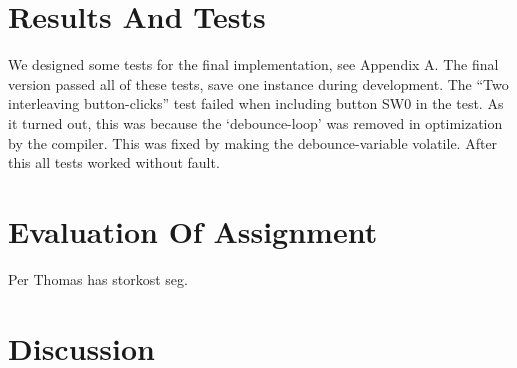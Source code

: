 \documentclass[a4paper,12pt]{article}
\begin{document}
\clearpage
\section{Results And Tests}
We designed some tests for the final implementation, see Appendix A. The final version passed all of these tests, save one instance during development. The  “Two interleaving button-clicks” test failed when including button SW0 in the test. As it turned out, this was because the ‘debounce-loop’ was removed in optimization by the compiler. This was fixed by making the debounce-variable volatile. After this all tests worked without fault.

\clearpage
\section{Evaluation Of Assignment}
Per Thomas has storkost seg.
\clearpage
\section{Discussion}
\end{document}

